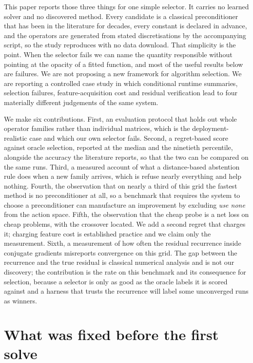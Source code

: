 \documentclass[11pt]{article}
\begin{document}
This paper reports those three things for one simple selector. It
carries no learned solver and no discovered method. Every candidate is a
classical preconditioner that has been in the literature for decades, every
constant is declared in advance, and the operators are generated from
stated discretisations by the accompanying script, so the study reproduces with
no data download. That simplicity is the point. When the selector fails we can
name the quantity responsible without pointing at the opacity of a fitted
function, and most of the useful results below are failures. We are not proposing a new
framework for algorithm selection. We are reporting a controlled case study in which
conditional runtime summaries, selection failures, feature-acquisition cost and residual
verification lead to four materially different judgements of the same system.

We make six contributions. First, an evaluation protocol that holds out whole
operator families rather than individual matrices, which is the deployment-
realistic case and which our own selector fails. Second, a regret-based score
against oracle selection, reported at the median and the ninetieth percentile,
alongside the accuracy the literature reports, so that the two can be compared on
the same runs. Third, a measured account of what a distance-based abstention rule
does when a new family arrives, which is refuse nearly everything and
help nothing. Fourth, the observation that on nearly a
third of this grid the fastest method is no preconditioner at all, so a benchmark
that requires the system to choose a preconditioner can manufacture an
improvement by excluding \emph{use none} from the action space. Fifth, the
observation that the cheap probe is a net loss on cheap problems, with the crossover
located. We add a second regret that charges it; charging feature cost is established
practice \cite{aslib} and we claim only the measurement. Sixth, a measurement of
how often the residual recurrence inside conjugate gradients misreports convergence on
this grid. The gap between the recurrence and the true residual is classical numerical
analysis \cite{greenbaum,vdvye} and is not our discovery; the contribution is the rate on
this benchmark and its consequence for selection, because a selector is only as good as
the oracle labels it is scored against and a harness that trusts the recurrence will
label some unconverged runs as winners.

\section{What was fixed before the first solve}
\end{document}
